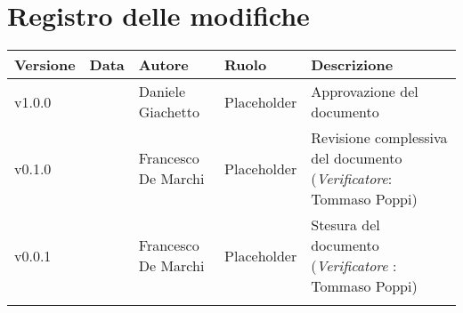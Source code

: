 \section*{\hfil Registro delle modifiche \hfil}
{
	\newlength{\freewidth}
	\setlength{\freewidth}{\dimexpr\textwidth-10\tabcolsep}
	\renewcommand{\arraystretch}{1.5}
	\centering
	\setlength{\aboverulesep}{0pt}
	\setlength{\belowrulesep}{0pt}
	\begin{longtable}{C{.131777\freewidth} C{.134036\freewidth} C{.263554\freewidth} C{.188254\freewidth} C{.282379\freewidth}}
		\toprule 
		\textbf{Versione} & \textbf{Data} & \textbf{Autore} & \textbf{Ruolo} & \textbf{Descrizione}\\
		\toprule
		\endhead
		
		v1.0.0 & \DataDoc{} &Daniele Giachetto & Placeholder & Approvazione del documento \\  
		v0.1.0 & \DataDoc{} & Francesco De Marchi & Placeholder & Revisione complessiva del documento (\textit{Verificatore}: Tommaso Poppi) \\ 
		v0.0.1 & \DataDoc{} & Francesco De Marchi & Placeholder & Stesura del documento (\textit{Verificatore} : Tommaso Poppi) \\
		
		
		\bottomrule
		\hiderowcolors
	\end{longtable}
}
